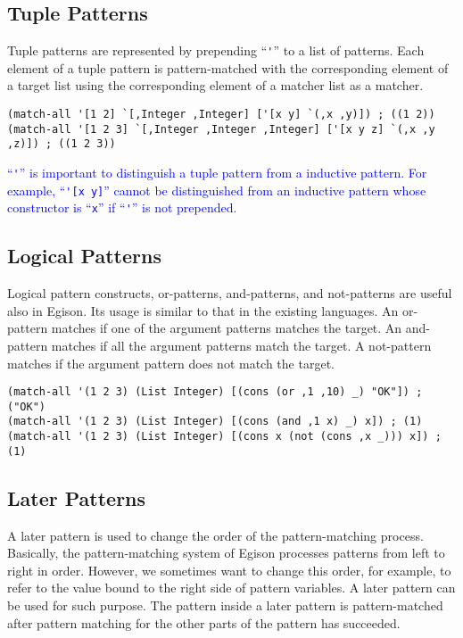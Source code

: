 \documentclass[acmlarge]{acmart}
\newcommand{\new}[1]{\textcolor{blue}{#1}}
\begin{document}
\subsection{Tuple Patterns}

Tuple patterns are represented by prepending ``\lstinline{'}'' to a list of patterns.
Each element of a tuple pattern is pattern-matched with the corresponding element of a target list using the corresponding element of a matcher list as a matcher.

\begin{lstlisting}[language=egison]
(match-all '[1 2] `[,Integer ,Integer] ['[x y] `(,x ,y)]) ; ((1 2))
(match-all '[1 2 3] `[,Integer ,Integer ,Integer] ['[x y z] `(,x ,y ,z)]) ; ((1 2 3))
\end{lstlisting}

\new{
``\lstinline{'}'' is important to distinguish a tuple pattern from a inductive pattern.
For example, ``\lstinline{'[x y]}'' cannot be distinguished from an inductive pattern whose constructor is ``\lstinline{x}'' if ``\lstinline{'}'' is not prepended.
}%

\subsection{Logical Patterns}

Logical pattern constructs, or-patterns, and-patterns, and not-patterns are useful also in Egison.
Its usage is similar to that in the existing languages.
An or-pattern matches if one of the argument patterns matches the target.
An and-pattern matches if all the argument patterns match the target.
A not-pattern matches if the argument pattern does not match the target.

\begin{lstlisting}[language=egison]
(match-all '(1 2 3) (List Integer) [(cons (or ,1 ,10) _) "OK"]) ; ("OK")
(match-all '(1 2 3) (List Integer) [(cons (and ,1 x) _) x]) ; (1)
(match-all '(1 2 3) (List Integer) [(cons x (not (cons ,x _))) x]) ; (1)
\end{lstlisting}

\subsection{Later Patterns}

A later pattern is used to change the order of the pattern-matching process.
Basically, the pattern-matching system of Egison processes patterns from left to right in order.
However, we sometimes want to change this order, for example, to refer to the value bound to the right side of pattern variables.
A later pattern can be used for such purpose.
The pattern inside a later pattern is pattern-matched after pattern matching for the other parts of the pattern has succeeded.
\end{document}
